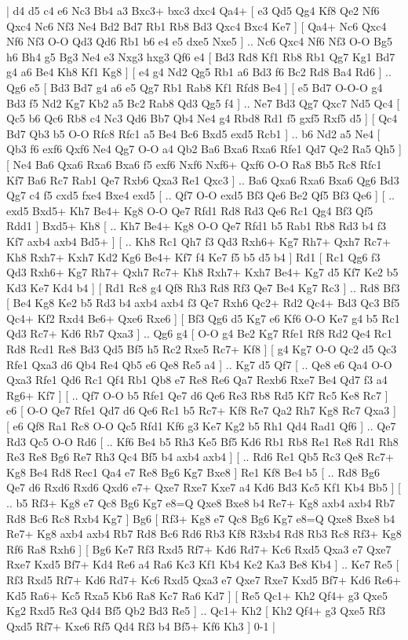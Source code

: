 \makegametitle 
|   d4   d5    c4   e6    Nc3   Bb4    a3   Bxc3+    bxc3   dxc4    Qa4+ [  e3 Qd5  Qg4 Kf8  Qe2 Nf6  Qxc4 Nc6  Nf3 Ne4  Bd2 Bd7  Rb1 Rb8  Bd3 Qxc4  Bxc4 Ke7   ]  [  Qa4+ Nc6  Qxc4 Nf6  Nf3 O-O  Qd3 Qd6  Rb1 b6  e4 e5  dxe5 Nxe5   ] .. Nc6    Qxc4   Nf6    Nf3   O-O    Bg5   h6    Bh4   g5    Bg3   Ne4    e3   Nxg3    hxg3   Qf6    e4 [  Bd3 Rd8  Kf1 Rb8  Rb1 Qg7  Kg1 Bd7  g4 a6  Be4 Kh8  Kf1 Kg8   ]  [  e4 g4  Nd2 Qg5  Rb1 a6  Bd3 f6  Bc2 Rd8  Ba4 Rd6   ] .. Qg6    e5 [  Bd3 Bd7  g4 a6  e5 Qg7  Rb1 Rab8  Kf1 Rfd8  Be4   ]  [  e5 Bd7  O-O-O g4  Bd3 f5  Nd2 Kg7  Kb2 a5  Bc2 Rab8  Qd3 Qg5  f4   ] .. Ne7    Bd3   Qg7    Qxc7   Nd5    Qc4 [  Qc5 b6  Qc6 Rb8  c4 Nc3  Qd6 Bb7  Qb4 Ne4  g4 Rbd8  Rd1 f5  gxf5 Rxf5  d5   ]  [  Qc4 Bd7  Qb3 b5  O-O Rfc8  Rfc1 a5  Be4 Bc6  Bxd5 exd5  Rcb1   ] .. b6    Nd2   a5    Ne4 [  Qb3 f6  exf6 Qxf6  Ne4 Qg7  O-O a4  Qb2 Ba6  Bxa6 Rxa6  Rfe1 Qd7  Qe2 Ra5  Qh5   ]  [  Ne4 Ba6  Qxa6 Rxa6  Bxa6 f5  exf6 Nxf6  Nxf6+ Qxf6  O-O Ra8  Bb5 Rc8  Rfc1 Kf7  Ba6 Rc7  Rab1 Qe7  Rxb6 Qxa3  Re1 Qxc3   ] .. Ba6    Qxa6   Rxa6    Bxa6   Qg6    Bd3   Qg7    c4   f5    cxd5   fxe4    Bxe4   exd5 [ .. Qf7  O-O exd5  Bf3 Qe6  Be2 Qf5  Bf3 Qe6   ]  [ .. exd5  Bxd5+ Kh7  Be4+ Kg8  O-O Qe7  Rfd1 Rd8  Rd3 Qe6  Rc1 Qg4  Bf3 Qf5  Rdd1   ]  Bxd5+   Kh8 [ .. Kh7  Be4+ Kg8  O-O Qe7  Rfd1 b5  Rab1 Rb8  Rd3 b4  f3 Kf7  axb4 axb4  Bd5+   ]  [ .. Kh8  Rc1 Qh7  f3 Qd3  Rxh6+ Kg7  Rh7+ Qxh7  Rc7+ Kh8  Rxh7+ Kxh7  Kd2 Kg6  Be4+ Kf7  f4 Ke7  f5 b5  d5 b4   ]  Rd1 [  Rc1 Qg6  f3 Qd3  Rxh6+ Kg7  Rh7+ Qxh7  Rc7+ Kh8  Rxh7+ Kxh7  Be4+ Kg7  d5 Kf7  Ke2 b5  Kd3 Ke7  Kd4 b4   ]  [  Rd1 Rc8  g4 Qf8  Rh3 Rd8  Rf3 Qe7  Be4 Kg7  Rc3   ] .. Rd8    Bf3 [  Be4 Kg8  Ke2 b5  Rd3 b4  axb4 axb4  f3 Qc7  Rxh6 Qc2+  Rd2 Qc4+  Bd3 Qc3  Bf5 Qc4+  Kf2 Rxd4  Be6+ Qxe6  Rxe6   ]  [  Bf3 Qg6  d5 Kg7  e6 Kf6  O-O Ke7  g4 b5  Rc1 Qd3  Rc7+ Kd6  Rb7 Qxa3   ] .. Qg6    g4 [  O-O g4  Be2 Kg7  Rfe1 Rf8  Rd2 Qe4  Rc1 Rd8  Rcd1 Re8  Bd3 Qd5  Bf5 h5  Rc2 Rxe5  Rc7+ Kf8   ]  [  g4 Kg7  O-O Qc2  d5 Qc3  Rfe1 Qxa3  d6 Qb4  Re4 Qb5  e6 Qe8  Re5 a4   ] .. Kg7    d5   Qf7 [ .. Qe8  e6 Qa4  O-O Qxa3  Rfe1 Qd6  Rc1 Qf4  Rb1 Qb8  e7 Re8  Re6 Qa7  Rexb6 Rxe7  Be4 Qd7  f3 a4  Rg6+ Kf7   ]  [ .. Qf7  O-O b5  Rfe1 Qe7  d6 Qe6  Re3 Rb8  Rd5 Kf7  Rc5 Ke8  Rc7   ]  e6 [  O-O Qe7  Rfe1 Qd7  d6 Qe6  Rc1 b5  Rc7+ Kf8  Re7 Qa2  Rh7 Kg8  Rc7 Qxa3   ]  [  e6 Qf8  Ra1 Rc8  O-O Qc5  Rfd1 Kf6  g3 Ke7  Kg2 b5  Rh1 Qd4  Rad1 Qf6   ] .. Qe7    Rd3   Qc5    O-O   Rd6 [ .. Kf6  Be4 b5  Rh3 Ke5  Bf5 Kd6  Rb1 Rb8  Re1 Re8  Rd1 Rh8  Re3 Re8  Bg6 Re7  Rh3 Qc4  Bf5 b4  axb4 axb4   ]  [ .. Rd6  Re1 Qb5  Rc3 Qe8  Rc7+ Kg8  Be4 Rd8  Rec1 Qa4  e7 Re8  Bg6 Kg7  Bxe8   ]  Re1   Kf8    Be4   b5 [ .. Rd8  Bg6 Qe7  d6 Rxd6  Rxd6 Qxd6  e7+ Qxe7  Rxe7 Kxe7  a4 Kd6  Bd3 Kc5  Kf1 Kb4  Bb5   ]  [ .. b5  Rf3+ Kg8  e7 Qc8  Bg6 Kg7  e8=Q Qxe8  Bxe8 b4  Re7+ Kg8  axb4 axb4  Rb7 Rd8  Bc6 Rc8  Rxb4 Kg7   ]  Bg6 [  Rf3+ Kg8  e7 Qc8  Bg6 Kg7  e8=Q Qxe8  Bxe8 b4  Re7+ Kg8  axb4 axb4  Rb7 Rd8  Bc6 Rd6  Rb3 Kf8  R3xb4 Rd8  Rb3 Rc8  Rf3+ Kg8  Rf6 Ra8  Rxh6   ]  [  Bg6 Ke7  Rf3 Rxd5  Rf7+ Kd6  Rd7+ Kc6  Rxd5 Qxa3  e7 Qxe7  Rxe7 Kxd5  Bf7+ Kd4  Re6 a4  Ra6 Kc3  Kf1 Kb4  Ke2 Ka3  Be8 Kb4   ] .. Ke7    Re5 [  Rf3 Rxd5  Rf7+ Kd6  Rd7+ Kc6  Rxd5 Qxa3  e7 Qxe7  Rxe7 Kxd5  Bf7+ Kd6  Re6+ Kd5  Ra6+ Kc5  Rxa5 Kb6  Ra8 Kc7  Ra6 Kd7   ]  [  Re5 Qc1+  Kh2 Qf4+  g3 Qxe5  Kg2 Rxd5  Re3 Qd4  Bf5 Qb2  Bd3 Re5   ] .. Qc1+    Kh2    [  Kh2 Qf4+  g3 Qxe5  Rf3 Qxd5  Rf7+ Kxe6  Rf5 Qd4  Rf3 b4  Bf5+ Kf6  Kh3   ] 0-1  |

